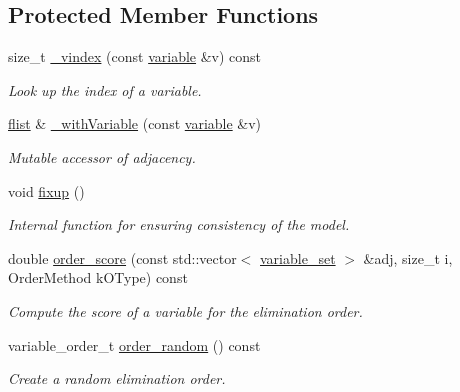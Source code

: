 \subsection*{Protected Member Functions}
\begin{DoxyCompactItemize}
\item 
size\+\_\+t \hyperlink{classmerlin_1_1graphical__model_a643284acb0bff3c9b6d0aed42e06ee0e}{\+\_\+vindex} (const \hyperlink{classmerlin_1_1variable}{variable} \&v) const 
\begin{DoxyCompactList}\small\item\em Look up the index of a variable. \end{DoxyCompactList}\item 
\hyperlink{classmerlin_1_1graphical__model_a615e25ec6594615fddfd4c3c4776b99f}{flist} \& \hyperlink{classmerlin_1_1graphical__model_a2b983604798f5fc92b024223fe9daf5f}{\+\_\+with\+Variable} (const \hyperlink{classmerlin_1_1variable}{variable} \&v)
\begin{DoxyCompactList}\small\item\em Mutable accessor of adjacency. \end{DoxyCompactList}\item 
\hypertarget{classmerlin_1_1graphical__model_a072ca3f28708cb4bab36db5b638ce861}{}void \hyperlink{classmerlin_1_1graphical__model_a072ca3f28708cb4bab36db5b638ce861}{fixup} ()\label{classmerlin_1_1graphical__model_a072ca3f28708cb4bab36db5b638ce861}

\begin{DoxyCompactList}\small\item\em Internal function for ensuring consistency of the model. \end{DoxyCompactList}\item 
double \hyperlink{classmerlin_1_1graphical__model_a4bc13ae4aa3bdba76bf398bfe07308ca}{order\+\_\+score} (const std\+::vector$<$ \hyperlink{classmerlin_1_1variable__set}{variable\+\_\+set} $>$ \&adj, size\+\_\+t i, Order\+Method k\+O\+Type) const 
\begin{DoxyCompactList}\small\item\em Compute the score of a variable for the elimination order. \end{DoxyCompactList}\item 
\hypertarget{classmerlin_1_1graphical__model_aae2a2d690804361f0edc4ca1147dcf39}{}variable\+\_\+order\+\_\+t \hyperlink{classmerlin_1_1graphical__model_aae2a2d690804361f0edc4ca1147dcf39}{order\+\_\+random} () const \label{classmerlin_1_1graphical__model_aae2a2d690804361f0edc4ca1147dcf39}

\begin{DoxyCompactList}\small\item\em Create a random elimination order. \end{DoxyCompactList}\end{DoxyCompactItemize}
